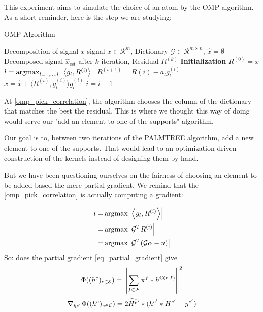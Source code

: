 This experiment aims to simulate the choice of an atom by the OMP algorithm. As a short reminder, here is the step we are studying:
\begin{algorithm}
    \caption{OMP Algorithm}
  \begin{algorithmic}[1]
    \Require Decomposition of signal $x$
    \Input signal $x \in \mathcal{R}^{m}$, Dictionary $\mathcal{G} \in \mathcal{R}^{m \times n}$, $\hat{x} = \emptyset$
    \Output Decomposed signal $\hat{x}_{\text{est}}$ after $k$ iteration, Residual $R^{(k)}$
    \State \textbf{Initialization} $R^{(0)} = x$
      \State $l =  \operatorname*{\arg\!\max}_{l = 1,\dots,l} |\left< g_l,R^{(i)} \right>|$ \label{omp_pick_correlation}
      \State $R^{(i+1)} = R{(i)}-a_l g_l^{(i)}$
      \State $\hat{x} = \hat{x}+\langle R^{(i)}, g_{l}^{(i)} \rangle g_{l}^{(i)}$
      \State $i = i + 1$
    \EndWhile
  \end{algorithmic}
\end{algorithm}

At \cref{omp_pick_correlation}, the algorithm chooses the column of the dictionary that matches the best the residual. This is where we thought this way of doing would serve our "add an element to one of the supports" algorithm.

Our goal is to, between two iterations of the PALMTREE algorithm, add a new element to one of the supports. That would lead to an optimization-driven construction of the kernels instead of designing them by hand.

But we have been questioning ourselves on the fairness of choosing an element to be added based the mere partial gradient. We remind that the \ref{omp_pick_correlation} is actually computing a gradient:

\begin{align*}
l =& \operatorname*{\arg\!\max} \left|\left< g_l,R^{(i)} \right>\right| \\
=& \operatorname*{\arg\!\max} \left| \mathcal{G}^TR^{(i)}\right| \\
=& \operatorname*{\arg\!\max} \left| \mathcal{G}^T(\mathcal{G}\alpha - u)\right| \\
\end{align*}
So: does the partial gradient \ref{eq_partial_gradient} give 
\begin{align*}
\Phi((h^e)_{e \in \mathcal E}) = \left\| \sum_{f\in\mathcal F} \mathbf x^f * h^{\mathbb C(r,f)} \right\|^2
\end{align*}
\begin{align*} 
\nabla_{h^{e'}}\Phi((h^e)_{e \in \mathcal E}) = 2 \widetilde{H^{e'}} * (h^{e'}*H^{e'}-y^{e'})
\end{align*} \label{eq_partial_gradient}






